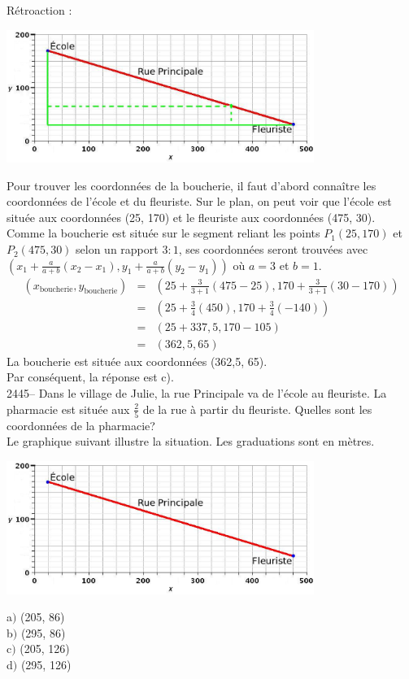 \documentclass[letterpaper, 12pt]{article}
\begin{document}
R\'etroaction :\\
\begin{center}
 \includegraphics[width=10cm,bb=14 14 815 362]{Q2444r.eps}
\end{center}
Pour trouver les coordonn\'ees de la boucherie, il faut d'abord conna\^itre les coordonn\'ees de l'\'ecole et du fleuriste. Sur le plan, on peut voir que l'\'ecole est situ\'ee aux coordonn\'ees (25, 170) et le fleuriste aux coordonn\'ees (475, 30). Comme la boucherie est situ\'ee sur le segment reliant les points $P_{1}(25, 170)$ et $P_{2}(475, 30)$ selon un rapport $3:1$, ses coordonn\'ees seront trouv\'ees avec\\
$\left( x_{1}+\frac{a}{a+b}(x_{2}-x_{1}), y_{1}+\frac{a}{a+b}(y_{2}-y_{1})\right) $ o\`u $a=3$ et $b=1$.
\begin{eqnarray*}
 (x_{\textrm{boucherie}},y_{\textrm{boucherie}})&=&\left( 25+\frac{3}{3+1}(475-25), 170+\frac{3}{3+1}(30-170)\right) \\[2mm]
&=&\left( 25+\frac{3}{4}(450), 170+\frac{3}{4}(-140)\right) \\[2mm]
&=&\left( 25+337,5, 170-105\right) \\[2mm]
&=&\left( 362,5, 65\right)
\end{eqnarray*}
La boucherie est situ\'ee aux coordonn\'ees (362,5, 65).\\
Par cons\'equent, la r\'eponse est c).\\

2445--  Dans le village de Julie, la rue Principale va de l'\'ecole au fleuriste. La pharmacie est situ\'ee aux $\frac{2}{5}$ de la rue \`a partir du fleuriste. Quelles sont les coordonn\'ees de la pharmacie? \\
Le graphique suivant illustre la situation. Les graduations sont en m\`etres. \\
\begin{center}
 \includegraphics[width=10cm,bb=14 14 815 362]{Q2438.eps}
\end{center}
a$)$ (205, 86)\\
b$)$ (295, 86)\\
c$)$ (205, 126)\\
d$)$ (295, 126)\\
\end{document}
